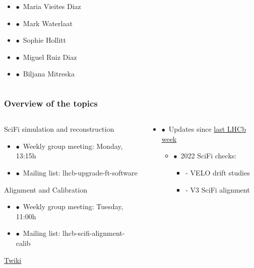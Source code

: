 \documentclass[aspectratio=1610, 12pt, xcolor=dvipsnames]{beamer}
\begin{document}
\begin{frame}
\begin{columns}
\begin{column}[c]{0.6\textwidth}
\begin{columns}
\begin{column}[c]{0.55\textwidth}
\begin{itemize}
              \item $\bullet$\, Maria Vieites Diaz
              \item $\bullet$\, Mark Waterlaat
              \item $\bullet$\, Sophie Hollitt
              \item $\bullet$\, Miguel Ruiz Diaz
              \item $\bullet$\, Biljana Mitreska
            \end{itemize}  
          \end{column}
      \end{columns}      
    \end{column}
  \end{columns}
\end{frame}

\begin{frame}\frametitle{Overview of the topics}
  \begin{columns}
    \begin{column}[c]{0.33\textwidth}
      SciFi simulation and reconstruction
      \begin{itemize}
        \item $\bullet$\, Weekly group meeting: Monday, 13:15h
        \item $\bullet$\, Mailing list: lhcb-upgrade-ft-software
      \end{itemize}
      Alignment and Calibration
      \begin{itemize}
        \item $\bullet$\, Weekly group meeting: Tuesday, 11:00h
        \item $\bullet$\, Mailing list: lhcb-scifi-alignment-calib
      \end{itemize}
      \href{https://twiki.cern.ch/twiki/bin/view/LHCb/SciFiSimulation}{Twiki}
    \end{column}
    \begin{column}[c]{0.66\textwidth}
      \begin{itemize}
        \item \small $\bullet$\, Updates since \href{https://indico.cern.ch/event/1253790/}{last LHCb week}
        \begin{itemize}
          \item $\bullet$\, 2022 SciFi checks:
          \begin{itemize}
            \item - VELO drift studies
            \item - V3 SciFi alignment

\end{itemize}
\end{itemize}
\end{itemize}
\end{column}
\end{columns}
\end{frame}
\end{document}
